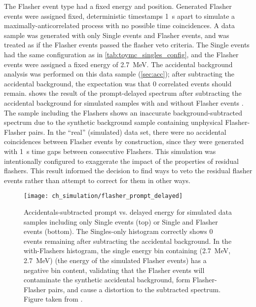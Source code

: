 The Flasher event type had a fixed energy and position.
Generated Flasher events were assigned fixed, deterministic timestamps \SI{1}{\s} apart
to simulate a maximally-anticorrelated process with no possible time coincidences.
A data sample was generated with only Single events and Flasher events,
and was treated as if the Flasher events passed the flasher veto criteria.
The Single events had the same configuration as in \cref{tab:toymc_singles_config},
and the Flasher events were assigned a fixed energy of \SI{2.7}{\MeV}.
The accidental background analysis was performed on this data sample (\cref{sec:acc});
after subtracting the accidental background,
the expectation was that 0 correlated events should remain.
 shows the result of the prompt-delayed spectrum
after subtracting the accidental background
for simulated samples with and without Flasher events \cite{flasher_sim}.
The sample including the Flashers shows
an inaccurate background-subtracted spectrum
due to the synthetic background sample containing unphysical Flasher-Flasher pairs.
In the ``real'' (simulated) data set,
there were no accidental coincidences between Flasher events by construction,
since they were generated with \SI{1}{\s} time gaps
between consecutive Flashers.
This simulation was intentionally configured to exaggerate the impact
of the properties of residual flashers.
This result informed the decision to find ways to veto the residual flasher events
rather than attempt to correct for them in other ways.

\begin{figure}
    \centering
    \texttt{[image: ch\_simulation/flasher\_prompt\_delayed]}
    \caption[Simulated residual flashers impact]{
        Accidentals-subtracted prompt vs. delayed energy for simulated data samples
        including only Single events (top) or Single and Flasher events (bottom).
        The Singles-only histogram correctly shows 0 events remaining
        after subtracting the accidental background.
        In the with-Flashers histogram,
        the single energy bin containing (\SI{2.7}{\MeV}, \SI{2.7}{\MeV})
        (the energy of the simulated Flasher events)
        has a negative bin content,
        validating that the Flasher events
        will contaminate the synthetic accidental background,
        form Flasher-Flasher pairs, and cause a distortion to the subtracted spectrum.
        Figure taken from \cite{flasher_sim}.
    }
    \label{fig:sim_flasher_prompt_delayed}
\end{figure}


